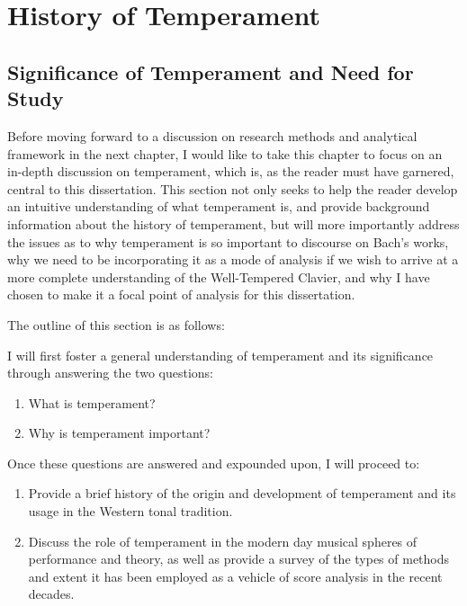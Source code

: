     
    
    
    

    \hypertarget{History of Temperament}{\chapter{History of Temperament}\label{History of Temperament}}
    \section{Significance of Temperament and Need for
Study}\label{significance-of-temperament-and-need-for-study}

Before moving forward to a discussion on research methods and analytical
framework in the next chapter, I would like to take this chapter to
focus on an in-depth discussion on temperament, which is, as the reader
must have garnered, central to this dissertation. This section not only
seeks to help the reader develop an intuitive understanding of what
temperament is, and provide background information about the history of
temperament, but will more importantly address the issues as to why
temperament is so important to discourse on Bach's works, why we need to
be incorporating it as a mode of analysis if we wish to arrive at a more
complete understanding of the Well-Tempered Clavier, and why I have
chosen to make it a focal point of analysis for this dissertation.

The outline of this section is as follows:

I will first foster a general understanding of temperament and its
significance through answering the two questions:

\begin{enumerate}
\def\labelenumi{\arabic{enumi}.}
\tightlist
\item
  What is temperament?
\item
  Why is temperament important?
\end{enumerate}

Once these questions are answered and expounded upon, I will proceed to:

\begin{enumerate}
\def\labelenumi{\arabic{enumi}.}
\setcounter{enumi}{2}
\tightlist
\item
  Provide a brief history of the origin and development of temperament
  and its usage in the Western tonal tradition.
\item
  Discuss the role of temperament in the modern day musical spheres of
  performance and theory, as well as provide a survey of the types of
  methods and extent it has been employed as a vehicle of score analysis
  in the recent decades.
\end{enumerate}


